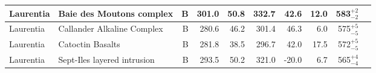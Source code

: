 \begin{longtable}{p{1 in}p{1 in}rrrrrrrp{1.5 in}}
                     Laurentia &                         Baie des Moutons complex &      B &     301.0 &      50.8 & 332.7 &  42.6 &      12.0 &      583$^{+2}_{-2}$ &                             \cite{McCausland2011a} \\ \hline
                     Laurentia &                       Callander Alkaline Complex &      B &     280.6 &      46.2 & 301.4 &  46.3 &       6.0 &      575$^{+5}_{-5}$ &                                 \cite{Symons1991a} \\ \hline
                     Laurentia &                                 Catoctin Basalts &      B &     281.8 &      38.5 & 296.7 &  42.0 &      17.5 &      572$^{+5}_{-5}$ &                                  \cite{Meert1994a} \\ \hline
                     Laurentia &                      Sept-Iles layered intrusion &      B &     293.5 &      50.2 & 321.0 & -20.0 &       6.7 &      565$^{+4}_{-4}$ &                                 \cite{Tanczyk1987a} \\ \hline
\end{longtable}
